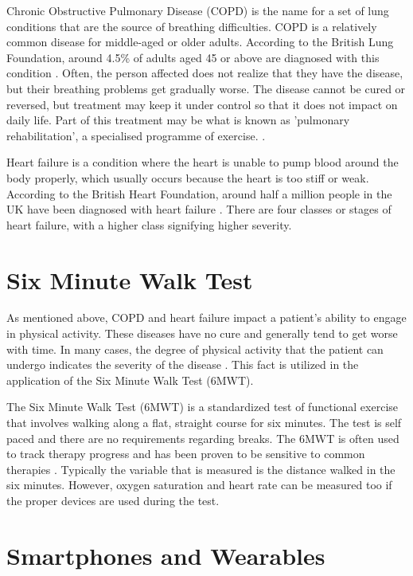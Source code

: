             Chronic Obstructive Pulmonary Disease (COPD) is the name for a set of lung conditions that are the source of breathing difficulties. COPD is a relatively common disease for middle-aged or older adults. According to the British Lung Foundation, around 4.5\% of adults aged 45 or above are diagnosed with this condition \cite{copd_stats}. Often, the person affected does not realize that they have the disease, but their breathing problems get gradually worse. The disease cannot be cured or reversed, but treatment may keep it under control so that it does not impact on daily life. Part of this treatment may be what is known as 'pulmonary rehabilitation', a specialised programme of exercise. \cite{copd_nhs}.

            Heart failure is a condition where the heart is unable to pump blood around the body properly, which usually occurs because the heart is too stiff or weak. According to the British Heart Foundation, around half a million people in the UK have been diagnosed with heart failure \cite{heart_failure_stats}. There are four classes or stages of heart failure, with a higher class signifying higher severity. 

        \section{Six Minute Walk Test}

            As mentioned above, COPD and heart failure impact a patient's ability to engage in physical activity. These diseases have no cure and generally tend to get worse with time. In many cases, the degree of physical activity that the patient can undergo indicates the severity of the disease \cite{six_minute_walk_test}. This fact is utilized in the application of the Six Minute Walk Test (6MWT).

            The Six Minute Walk Test (6MWT) is a standardized test of functional exercise that involves walking along a flat, straight course for six minutes. The test is self paced and there are no requirements regarding breaks. The 6MWT is often used to track therapy progress and has been proven to be sensitive to common therapies \cite{six_minute_walk_test}. Typically the variable that is measured is the distance walked in the six minutes. However, oxygen saturation and heart rate can be measured too if the proper devices are used during the test.

        \section{Smartphones and Wearables}

